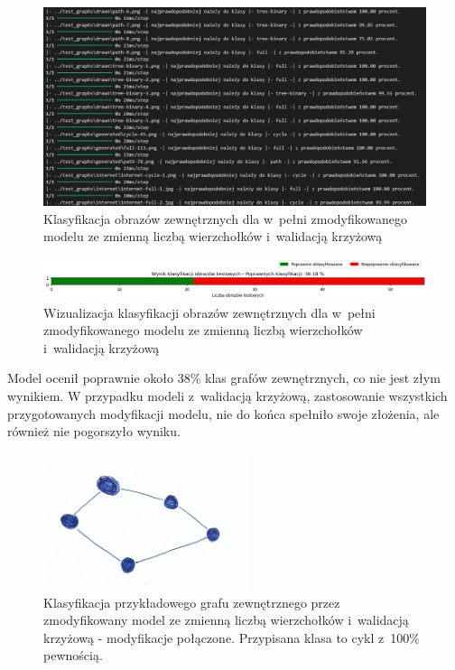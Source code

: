 \begin{figure}[ht]
	\centering
	\includegraphics[width=15.5cm]{resources/tests/images/v4/multiple_edges_crossvalid_txt.png}
	\caption{Klasyfikacja obrazów zewnętrznych dla w~pełni zmodyfikowanego modelu ze zmienną liczbą wierzchołków i~walidacją krzyżową}
	\label{Fig:tests-csvar-2b}
\end{figure}
\FloatBarrier

\begin{figure}[ht]
	\centering
	\includegraphics[width=15.5cm]{resources/tests/images/v4/multiple_edges_crossvalid_bar.png}
	\caption{Wizualizacja klasyfikacji obrazów zewnętrznych dla w~pełni zmodyfikowanego modelu ze zmienną liczbą wierzchołków i~walidacją krzyżową}
	\label{Fig:tests-csvar-2c}
\end{figure}
\FloatBarrier

Model ocenił poprawnie około 38\% klas grafów zewnętrznych, co nie jest złym wynikiem.
W przypadku modeli z~walidacją krzyżową, zastosowanie wszystkich przygotowanych modyfikacji modelu,
nie do końca spełniło swoje złożenia, ale również nie pogorszyło wyniku.

\begin{figure}[ht]
	\centering
	\includegraphics[height=4cm]{../graph_classification/test_graphs/drawn/cycle-2.png}
	\caption{Klasyfikacja przykładowego grafu zewnętrznego przez zmodyfikowany model
		ze zmienną liczbą wierzchołków i~walidacją krzyżową - modyfikacje połączone.
		Przypisana klasa to cykl z~100\% pewnością.}
	\label{Fig:tests-cv-2d}
\end{figure}
\FloatBarrier